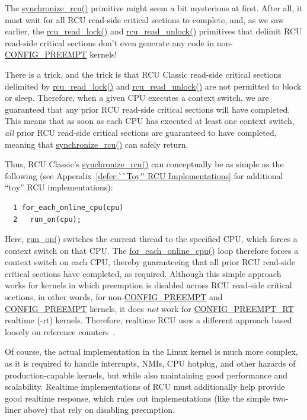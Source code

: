 The \url{synchronize_rcu()} primitive might seem a bit
mysterious at first.
After all, it must wait for all RCU read-side critical sections to
complete, and, as we saw earlier, the
\url{rcu_read_lock()} and \url{rcu_read_unlock()} primitives
that delimit RCU read-side critical sections don't even generate any
code in non-\url{CONFIG_PREEMPT} kernels!

There is a trick, and the trick is that RCU Classic read-side critical
sections delimited by \url{rcu_read_lock()} and
\url{rcu_read_unlock()} are not permitted to block or sleep.
Therefore, when a given CPU executes a context switch, we are guaranteed
that any prior RCU read-side critical sections will have completed.
This means that as soon as each
CPU has executed at least one context switch, \emph{all}
prior RCU read-side critical sections are guaranteed to have completed,
meaning that \url{synchronize_rcu()} can safely return.

Thus, RCU Classic's \url{synchronize_rcu()}
can conceptually be as simple as the following
(see Appendix~\ref{defer:``Toy'' RCU Implementations}
for additional ``toy'' RCU implementations):

\vspace{5pt}
\begin{minipage}[t]{\columnwidth}
\begin{verbatim}
  1 for_each_online_cpu(cpu)
  2   run_on(cpu);
\end{verbatim}
\end{minipage}
\vspace{5pt}

Here, \url{run_on()} switches the current thread to the
specified CPU, which forces a context switch on that CPU.
The \url{for_each_online_cpu()} loop therefore forces a
context switch on each CPU, thereby guaranteeing that all prior
RCU read-side critical sections have completed, as required.
Although this simple approach works for kernels in which preemption
is disabled across RCU read-side critical sections, in other
words, for non-\url{CONFIG_PREEMPT} and \url{CONFIG_PREEMPT}
kernels, it does \emph{not} work for \url{CONFIG_PREEMPT_RT}
realtime (-rt) kernels.
Therefore, realtime RCU uses a different approach based loosely on reference
counters~\cite{PaulEMcKenney2007PreemptibleRCU}.

Of course, the actual implementation in the Linux kernel
is much more complex, as it is required
to handle interrupts, NMIs, CPU hotplug, and other hazards of
production-capable kernels, but while also maintaining good performance and
scalability.
Realtime implementations of RCU must additionally help provide good
realtime response, which rules out implementations (like the simple
two-liner above) that rely on disabling preemption.

